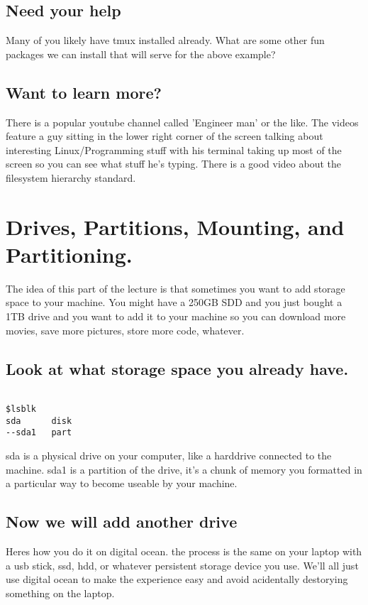 \documentclass[10pt]{article}
\begin{document}
\subsection{Need your help}
Many of you likely have tmux installed already. What
are some other fun packages we can install that will serve for the above
example?

\subsection{Want to learn more?}

There is a popular youtube channel called
'Engineer man' or the like. The videos feature a guy sitting in the lower right
corner of the screen talking about interesting Linux/Programming stuff with his
terminal taking up most of the screen so you can see what stuff he's typing.
There is a good video about the filesystem hierarchy standard.


\section{Drives, Partitions, Mounting, and Partitioning.}

 The idea of this part
of the lecture is that sometimes you want to add storage space to your machine.
You might have a 250GB SDD and you just bought a 1TB drive and you want to add
it to your machine so you can download more movies, save more pictures, store
more code, whatever.

\subsection{Look at what storage space you already have.}

\begin{lstlisting}

$lsblk
sda      disk
--sda1   part 
\end{lstlisting}

sda is a physical drive on your computer, like a harddrive connected to the
machine. sda1 is a partition of the drive, it's a chunk of memory you formatted
in a particular way to become useable by your machine.

\subsection{ Now we will add another drive}
Heres how you do it on digital ocean. the process is the same on your laptop
with a usb stick, ssd, hdd, or whatever persistent storage device you use. We'll
all just use digital ocean to make the experience easy and avoid acidentally
destorying something on the laptop.
\end{document}
